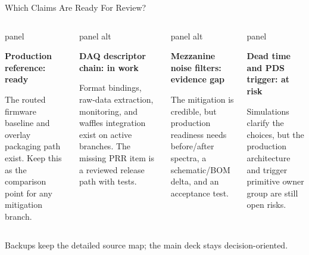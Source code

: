 \documentclass[aspectratio=169,10pt]{beamer}
\newcommand{\oktag}{\textcolor{okgreen}{\bfseries ready}}
\newcommand{\worktag}{\textcolor{warnyellow}{\bfseries in work}}
\newcommand{\risktag}{\textcolor{riskred}{\bfseries at risk}}
\newcommand{\unknowntag}{\textcolor{noirmuted}{\bfseries evidence gap}}
\newcommand{\panelbox}[3][panel]{%
  \begin{beamercolorbox}[wd=\linewidth,sep=4pt,rounded=true]{#1}
    {\color{noircyan}\bfseries #2\par}
    \vspace{0.3mm}
    {\footnotesize #3\par}
  \end{beamercolorbox}
}
\begin{document}
\begin{frame}{Which Claims Are Ready For Review?}
  \begin{columns}[T,onlytextwidth]
      \panelbox{Production reference: \oktag}{The routed firmware baseline and overlay packaging path exist. Keep this as the comparison point for any mitigation branch.}
      \vspace{3mm}
      \panelbox[panel alt]{DAQ descriptor chain: \worktag}{Format bindings, raw-data extraction, monitoring, and waffles integration exist on active branches. The missing PRR item is a reviewed release path with tests.}
      \panelbox[panel alt]{Mezzanine noise filters: \unknowntag}{The mitigation is credible, but production readiness needs before/after spectra, a schematic/BOM delta, and an acceptance test.}
      \vspace{3mm}
      \panelbox{Dead time and PDS trigger: \risktag}{Simulations clarify the choices, but the production architecture and trigger primitive owner group are still open risks.}
  \end{columns}
  \vspace{4mm}
  {\color{noirmuted}\footnotesize Backups keep the detailed source map; the main deck stays decision-oriented.\par}
\end{frame}
\end{document}
